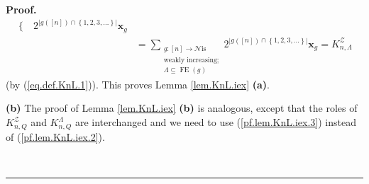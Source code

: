 \documentclass[numbers=enddot,12pt,final,onecolumn,notitlepage]{scrartcl}%
\theoremstyle{definition}
\newenvironment{proof}[1][Proof]{\noindent\textbf{#1.} }{\ \rule{0.5em}{0.5em}}
\newenvironment{vershort}{}{}
\let\sumnonlimits\sum
\renewcommand{\sum}{\sumnonlimits\limits}
\begin{document}
\begin{proof}
\begin{align*}
\begin{cases}
\end{cases}
2^{\left\vert g\left(  \left[  n\right]  \right)  \cap\left\{  1,2,3,\ldots
\right\}  \right\vert }\mathbf{x}_{g}\\
&  =\sum_{\substack{g:\left[  n\right]  \rightarrow\mathcal{N}\text{
is}\\\text{weakly increasing;}\\\Lambda\subseteq\operatorname*{FE}\left(
g\right)  }}2^{\left\vert g\left(  \left[  n\right]  \right)  \cap\left\{
1,2,3,\ldots\right\}  \right\vert }\mathbf{x}_{g}=K_{n,\Lambda}^{\mathcal{Z}}%
\end{align*}
(by (\ref{eq.def.KnL.1})). This proves Lemma \ref{lem.KnL.iex} \textbf{(a)}.

\begin{vershort}
\textbf{(b)} The proof of Lemma \ref{lem.KnL.iex} \textbf{(b)} is analogous,
except that the roles of $K_{n,Q}^{\mathcal{Z}}$ and $K_{n,Q}^{\Lambda}$ are
interchanged and we need to use (\ref{pf.lem.KnL.iex.3}) instead of
(\ref{pf.lem.KnL.iex.2}).
\end{vershort}


\end{proof}
\end{document}
